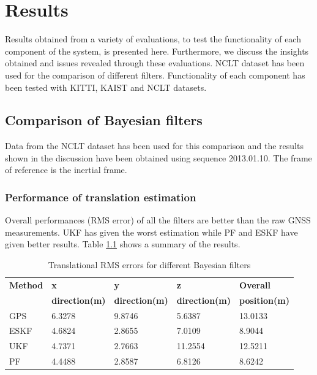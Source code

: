 \chapter{Results}
\label{chapter:results}
Results obtained from a variety of evaluations, to test the functionality of each component of the system, is presented here. Furthermore, we discuss the insights obtained and issues revealed through these evaluations. \gls{NCLT} dataset has been used for the comparison of different filters. Functionality of each component has been tested with \gls{KITTI}, \gls{KAIST} and \gls{NCLT} datasets.



\section{Comparison of Bayesian filters}
\label{sec:BayesianFilterComparison}
Data from the \gls{NCLT} dataset has been used for this comparison and the results shown in the discussion have been obtained using sequence 2013.01.10. The frame of reference is the inertial frame.
\subsection{Performance of translation estimation}
Overall performances (\gls{RMS} error) of all the filters are better than the raw \gls{GNSS} measurements. \gls{UKF} has given the worst estimation while \gls{PF} and \gls{ESKF} have given better results. Table \ref{table:ch:RMSErrorPosition} shows a summary of the results.
\begin{table}[htp]
    \centering
    \begin{tabular}{|p{2.5cm}|p{2.5cm}|p{2.5cm}|p{2.5cm}|p{2.5cm}|} 
        \hline
        \textbf{Method} & \textbf{x} & \textbf{y} & \textbf{z}& \textbf{Overall} \\
        \textbf{} & \textbf{direction(m)} & \textbf{direction(m)} & \textbf{direction(m)}& \textbf{position(m)} \\
        \hline
        GPS&6.3278 &9.8746 &5.6387& 13.0133\\
        \hline
        ESKF &4.6824& 2.8655 &7.0109 &8.9044\\
        \hline
        UKF &4.7371& 2.7663 &11.2554 &12.5211
        \\
        \hline
        PF& 4.4488& 2.8587& 6.8126& 8.6242
        \\
        \hline
    \end{tabular}
\caption{Translational RMS errors for different Bayesian filters}
\label{table:ch:RMSErrorPosition}
\end{table}


